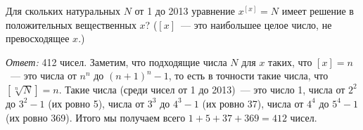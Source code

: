 \problem
Для скольких натуральных $N$ от 1 до 2013 уравнение $x^{[x]} = N$ имеет
решение в положительных вещественных $x$?
($[x]$~--- это наибольшее целое число, не превосходящее $x$.)

\solution
\emph{Ответ:} 412 чисел.
Заметим, что подходящие числа $N$ для $x$ таких, что $[x] = n$~--- это числа от
$n^n$ до $(n+1)^n - 1$, то есть в точности такие числа, что
$[\sqrt[n]{N}] = n$.
Такие числа (среди чисел от 1 до 2013)~--- это
число 1,
числа от $2^2$ до $3^2 - 1$ (их ровно 5),
числа от $3^3$ до $4^3 - 1$ (их ровно 37),
числа от $4^4$ до $5^4 - 1$ (их ровно 369).
Итого мы получаем всего $1 + 5 + 37 + 369 = 412$ чисел.
\endproblem
